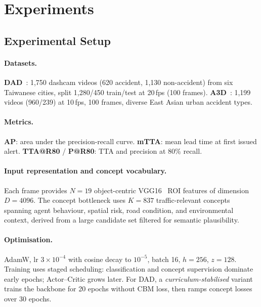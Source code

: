 
\section{Experiments}
\label{sec:experiments}

\subsection{Experimental Setup}

\paragraph{Datasets.}
\textbf{DAD}~\citep{ref4}: 1,750 dashcam videos (620 accident,
1,130 non-accident) from six Taiwanese cities, split 1,280/450
train/test at 20\,fps (100 frames).
\textbf{A3D}~\citep{liao2024crash}: 1,199 videos (960/239) at 10\,fps,
100 frames, diverse East Asian urban accident types.

\paragraph{Metrics.}
\textbf{AP}: area under the precision-recall curve.
\textbf{mTTA}: mean lead time at first issued alert.
\textbf{TTA@R80} / \textbf{P@R80}: TTA and precision at 80\% recall.

\paragraph{Input representation and concept vocabulary.}
Each frame provides $N{=}19$ object-centric VGG16~\citep{ref31} ROI
features of dimension $D{=}4096$.
The concept bottleneck uses $K{=}837$ traffic-relevant concepts spanning
agent behaviour, spatial risk, road condition, and environmental context,
derived from a large candidate set filtered for semantic plausibility.

\paragraph{Optimisation.}
AdamW, lr $3 \times 10^{-4}$ with cosine decay to $10^{-5}$, batch 16,
$h=256$, $z=128$. Training uses staged scheduling: classification and
concept supervision dominate early epochs; Actor--Critic grows later.
For DAD, a \emph{curriculum-stabilised} variant trains the backbone
for 20 epochs without CBM loss, then ramps concept losses over 30 epochs.

